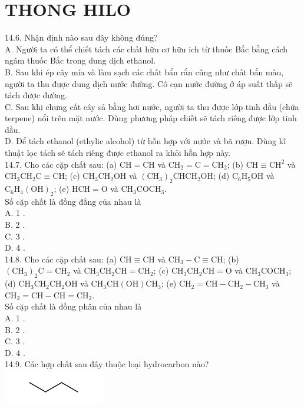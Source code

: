 \documentclass[10pt]{article}
\begin{document}
\section*{THONG HILO}
14.6. Nhận định nào sau đây không đúng?\\
A. Người ta có thể chiết tách các chất hữu cơ hữu ich từ thuốc Bắc bằng cách ngâm thuốc Bắc trong dung dịch ethanol.\\
B. Sau khi ép cây mía và làm sạch các chất bẩn rắn cũng như chất bẩn màu, người ta thu được dung dịch nước đường. Cô cạn nước đường ở áp suất thấp sẽ tách được đường.\\
C. Sau khi chưng cất cây sả bằng hơi nước, người ta thu được lớp tinh dầu (chứa terpene) nổi trên mặt nước. Dùng phương pháp chiết sẽ tách riêng được lớp tinh dầu.\\
D. Để tách ethanol (ethylic alcohol) từ hỗn hợp với nước và bã rượu. Dùng kĩ thuật lọc tách sẽ tách riêng được ethanol ra khỏi hỗn hợp này.\\
14.7. Cho các cặp chất sau: (a) $\mathrm{CH}=\mathrm{CH}$ và $\mathrm{CH}_{2}=\mathrm{C}=\mathrm{CH}_{2}$; (b) $\mathrm{CH} \equiv \mathrm{CH}^{2}$ và $\mathrm{CH}_{3} \mathrm{CH}_{2} \mathrm{C} \equiv \mathrm{CH}$; (c) $\mathrm{CH}_{3} \mathrm{CH}_{2} \mathrm{OH}$ và $\left(\mathrm{CH}_{3}\right)_{2} \mathrm{CHCH}_{2} \mathrm{OH}$; (d) $\mathrm{C}_{6} \mathrm{H}_{5} \mathrm{OH}$ và $\mathrm{C}_{6} \mathrm{H}_{4}(\mathrm{OH})_{2}$; (e) $\mathrm{HCH}=\mathrm{O}$ và $\mathrm{CH}_{3} \mathrm{COCH}_{3}$.\\
Số cặp chất là đồng đẳng của nhau là\\
A. 1 .\\
B. 2 .\\
C. 3 .\\
D. 4 .\\
14.8. Cho các cặp chất sau: (a) $\mathrm{CH} \equiv \mathrm{CH}$ và $\mathrm{CH}_{3}-\mathrm{C} \equiv \mathrm{CH}$; (b) $\left(\mathrm{CH}_{3}\right)_{2} \mathrm{C}=\mathrm{CH}_{2}$ và $\mathrm{CH}_{3} \mathrm{CH}_{2} \mathrm{CH}=\mathrm{CH}_{2}$; (c) $\mathrm{CH}_{3} \mathrm{CH}_{2} \mathrm{CH}=\mathrm{O}$ và $\mathrm{CH}_{3} \mathrm{COCH}_{3}$; (d) $\mathrm{CH}_{3} \mathrm{CH}_{2} \mathrm{CH}_{2} \mathrm{OH}$ và $\mathrm{CH}_{3} \mathrm{CH}(\mathrm{OH}) \mathrm{CH}_{3}$; (e) $\mathrm{CH}_{2}=\mathrm{CH}-\mathrm{CH}_{2}-\mathrm{CH}_{3}$ và $\mathrm{CH}_{2}=\mathrm{CH}-\mathrm{CH}=\mathrm{CH}_{2}$.\\
Số cặp chất là đồng phân của nhau là\\
A. 1 .\\
B. 2 .\\
C. 3 .\\
D. 4 .\\
14.9. Các hợp chất sau đây thuộc loại hydrocarbon nào?\\
\includegraphics{smile-c8d5b196e3330e32fc4032c3f1e3494df534800e}
\end{document}
